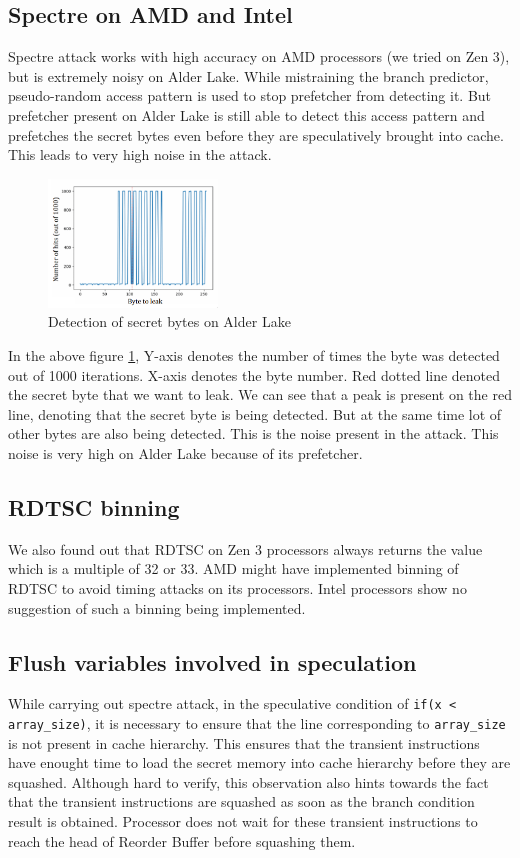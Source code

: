 \subsection{Spectre on AMD and Intel}
Spectre attack works with high accuracy on AMD processors (we tried on Zen 3), but is extremely noisy on Alder Lake. While mistraining the branch predictor, pseudo-random access pattern is used to stop prefetcher from detecting it. But prefetcher present on Alder Lake is still able to detect this access pattern and prefetches the secret bytes even before they are speculatively brought into cache. This leads to very high noise in the attack.
\begin{figure}[H]
    \centering
    \includegraphics[width=0.4\textwidth]{images/giff.png}
    \caption{Detection of secret bytes on Alder Lake}
    \label{gif}
\end{figure}
\indent In the above figure \ref{gif}, Y-axis denotes the number of times the byte was detected out of 1000 iterations. X-axis denotes the byte number. Red dotted line denoted the secret byte that we want to leak. We can see that a peak is present on the red line, denoting that the secret byte is being detected. But at the same time lot of other bytes are also being detected. This is the noise present in the attack. This noise is very high on Alder Lake because of its prefetcher.

\subsection{RDTSC binning}
\indent We also found out that RDTSC on Zen 3 processors always returns the value which is a multiple of 32 or 33. AMD might have implemented binning of RDTSC to avoid timing attacks on its processors. Intel processors show no suggestion of such a binning being implemented.

\subsection{Flush variables involved in speculation}
\indent While carrying out spectre attack, in the speculative condition of \texttt{if(x < array\_size)}, it is necessary to ensure that the line corresponding to \texttt{array\_size} is not present in cache hierarchy. This ensures that the transient instructions have enought time to load the secret memory into cache hierarchy before they are squashed. Although hard to verify, this observation also hints towards the fact that the transient instructions are squashed as soon as the branch condition result is obtained. Processor does not wait for these transient instructions to reach the head of Reorder Buffer before squashing them.

